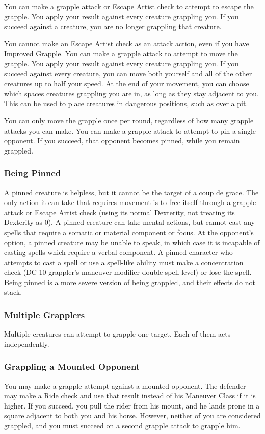  You can make a grapple attack or Escape Artist check to attempt to escape the grapple. You apply your result against every creature grappling you. If you succeed against a creature, you are no longer grappling that creature.
\par You cannot make an Escape Artist check as an attack action, even if you have Improved Grapple.
 You can make a grapple attack to attempt to move the grapple. You apply your result against every creature grappling you. If you succeed against every creature, you can move both yourself and all of the other creatures up to half your speed. At the end of your movement, you can choose which spaces creatures grappling you are in, as long as they stay adjacent to you. This can be used to place creatures in dangerous positions, such as over a pit.
\par You can only move the grapple once per round, regardless of how many grapple attacks you can make.
 You can make a grapple attack to attempt to pin a single opponent. If you succeed, that opponent becomes pinned, while you remain grappled.

\subsubsection{Being Pinned}
A pinned creature is helpless, but it cannot be the target of a coup de grace. The only action it can take that requires movement is to free itself through a grapple attack or Escape Artist check (using its normal Dexterity, not treating its Dexterity as 0). A pinned creature can take mental actions, but cannot cast any spells that require a somatic or material component or focus. At the opponent's option, a pinned creature may be unable to speak, in which case it is incapable of casting spells which require a verbal component. A pinned character who attempts to cast a spell or use a spell-like ability must make a concentration check (DC 10 \add grappler's maneuver modifier \add double spell level) or lose the spell. Being pinned is a more severe version of being grappled, and their effects do not stack.

\subsubsection{Multiple Grapplers}
Multiple creatures can attempt to grapple one target. Each of them acts independently.

\subsubsection{Grappling a Mounted Opponent}
You may make a grapple attempt against a mounted opponent. The defender may make a Ride check and use that result instead of his Maneuver Class if it is higher. If you succeed, you pull the rider from his mount, and he lands prone in a square adjacent to both you and his horse. However, neither of you are considered grappled, and you must succeed on a second grapple attack to grapple him.


